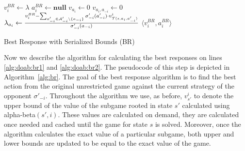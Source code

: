 \begin{algorithm2e}[t]
\small
{}
$v^{BR}_i \leftarrow \lambda$ \;
$a_i^{BR} \leftarrow \textbf{null}$ \;
 {%
	$v_{a_i} \leftarrow 0$\;
	 {\label{alg:br:opp}
    $v_{a_i,a_{-i}} \leftarrow 0$\;
		$\lambda_{a_i} \leftarrow \frac{v_i^{BR} - \sum_{a'_{-i} \in \mathcal{A}'_{-i} \setminus \lbrace a_{-i} \rbrace} \sigma'_{-i}(a'_{-i}) \cdot v^i_{\mathcal{T}(s,a_i,a'_{-i})}}{\sigma'_{-i}(a_{-i})}$\; \label{alg:br:bound}
	}
}
\Return $\langle v_i^{BR}, a_i^{BR} \rangle$
\caption{Best Response with Serialized Bounds (BR)}\label{alg:br}
\end{algorithm2e}

Now we describe the algorithm for calculating the best responses on lines \ref{alg:doab:br1} and \ref{alg:doab:br2}.
The pseudocode of this step is depicted in Algorithm~\ref{alg:br}.
The goal of the best response algorithm is to find the best action from the original unrestricted game against the current strategy of the opponent $\sigma'_{-i}$.
Throughout the algorithm we use, as before, $v^i_{s'}$ to denote the upper bound of the value of the subgame rooted in state $s'$ calculated using alpha-beta$(s',i)$.
These values are calculated on demand, \ie they are calculated once needed and cached until the game for state $s$ is solved.
Moreover, once the algorithm calculates the exact value of a particular subgame, both upper and lower bounds are updated to be equal to the exact value of the game.

